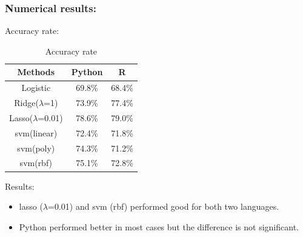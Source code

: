 \documentclass[xcolor={x11names,svgnames,dvipsnames}]{beamer}
\begin{document}
\begin{frame}
\frametitle{Numerical results:}

\begin{block}{Accuracy rate:}
\begin{table}[h!]\large
  \caption{Accuracy rate}
\begin{center}
    \begin{tabular}{| c | c| c | }
    \hline
    Methods& Python &  R\\
    \hline
Logistic  &69.8\%&	68.4\%\\
Ridge($\lambda$=1)&73.9\%	&77.4\%\\
Lasso($\lambda$=0.01)&78.6\%&	79.0\%\\
svm(linear)&72.4\%	&71.8\%\\
svm(poly)&74.3\%&	71.2\%\\
svm(rbf)&75.1\%	&72.8\%\\
\hline
\end{tabular}
\end{center}
\end{table}
\end{block}

\begin{block}{Results:}
\begin{itemize}
        \item lasso ($\lambda$=0.01) and svm (rbf) performed good for both two languages. 
        \item Python performed better in most cases but the difference is not significant.
    \end{itemize}

\end{block}
\end{frame}
\end{document}
